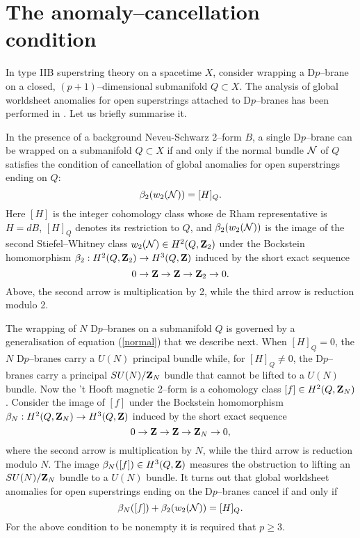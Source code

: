 \documentclass[a4paper,a4paper]{article}
\begin{document}
\section{The anomaly--cancellation condition}\label{ann}  
  
In type IIB superstring theory on a spacetime $X$, consider wrapping a   
D$p$--brane on a closed, $(p+1)$--dimensional submanifold $Q\subset X$. 
The analysis of global worldsheet anomalies for open superstrings attached 
to D$p$--branes has been performed in \cite{WITTENDK, FREEDWITTEN, KAPUSTIN}. 
Let us briefly summarise it.  
  
In the presence of a background Neveu-Schwarz 2--form $B$,  
a single D$p$--brane can be wrapped on a submanifold $Q\subset X$  
if and only if the normal bundle ${\cal N}$ of $Q$ satisfies the 
condition of cancellation of global anomalies for open superstrings 
ending on $Q$:   
\begin{equation}  
\beta_2(w_2({\cal N}))=[H]_Q.  
\label{normal}
\end{equation}  
Here $[H]$ is the integer cohomology class whose de Rham representative is   
$H=dB$, $[H]_Q$ denotes its restriction to $Q$, and  
$\beta_2(w_2({\cal N}))$   
is the image of the second Stiefel--Whitney class $w_2({\cal N}) 
\in H^2(Q,{\bf Z}_2)$   
under the Bockstein homomorphism $\beta_2:H^2(Q,{\bf Z}_2) 
\rightarrow H^3(Q, {\bf Z})$   
induced by the short exact sequence  
\begin{equation}  
0\rightarrow{\bf Z}\rightarrow{\bf Z}\rightarrow{\bf Z}_2\rightarrow 0.  
\label{shortuno}
\end{equation}  
Above, the second arrow is multiplication by 2, while the third arrow is   
reduction modulo 2.  
  
The wrapping of $N$ D$p$--branes on a submanifold $Q$ is governed by a   
generalisation of equation (\ref{normal}) that we describe next. When  
$[H]_Q=0$,  the $N$ D$p$--branes carry a $U(N)$ principal bundle while,  
for $[H]_Q\neq 0$, the D$p$--branes carry a principal $SU(N)/{\bf Z}_N$ 
bundle that cannot be lifted  to a $U(N)$ bundle.
Now the 't Hooft magnetic 2--form is a cohomology class   
$[f]\in H^2(Q,{\bf Z}_N)$. Consider the image of $[f]$ under  
the Bockstein homomorphism   
$\beta_N:H^2(Q,{\bf Z}_N)\rightarrow H^3(Q,{\bf Z})$ induced by  
the short exact sequence  
\begin{equation}  
0\rightarrow{\bf Z}\rightarrow{\bf Z}\rightarrow{\bf Z}_N\rightarrow 0,  
\label{shortdue}
\end{equation}  
where the second arrow is multiplication by $N$, while the  
third arrow is   
reduction modulo $N$. The image $\beta_N([f])\in 
 H^3(Q,{\bf Z})$ measures   
the obstruction to lifting an $SU(N)/{\bf Z}_N$ bundle  
to a $U(N)$ bundle.  
It turns out that global worldsheet anomalies for open superstrings   
ending on the D$p$--branes cancel if and only if
\begin{equation}  
\beta_N([f])+ \beta_2(w_2({\cal N}))=[H]_Q.  
\label{totalanomaly}
\end{equation}  
For the above condition to be nonempty it is required that $p\geq 3$.
\end{document}
